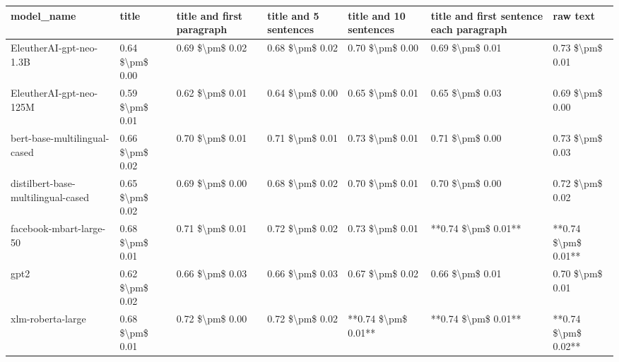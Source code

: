 \begin{tabular}{lllllll}
\toprule
                        model\_name &           title & title and first paragraph & title and 5 sentences & title and 10 sentences & title and first sentence each paragraph &            raw text \\
\midrule
           EleutherAI-gpt-neo-1.3B & 0.64 \$\textbackslash pm\$ 0.00 &           0.69 \$\textbackslash pm\$ 0.02 &       0.68 \$\textbackslash pm\$ 0.02 &        0.70 \$\textbackslash pm\$ 0.00 &                         0.69 \$\textbackslash pm\$ 0.01 &     0.73 \$\textbackslash pm\$ 0.01 \\
           EleutherAI-gpt-neo-125M & 0.59 \$\textbackslash pm\$ 0.01 &           0.62 \$\textbackslash pm\$ 0.01 &       0.64 \$\textbackslash pm\$ 0.00 &        0.65 \$\textbackslash pm\$ 0.01 &                         0.65 \$\textbackslash pm\$ 0.03 &     0.69 \$\textbackslash pm\$ 0.00 \\
      bert-base-multilingual-cased & 0.66 \$\textbackslash pm\$ 0.02 &           0.70 \$\textbackslash pm\$ 0.01 &       0.71 \$\textbackslash pm\$ 0.01 &        0.73 \$\textbackslash pm\$ 0.01 &                         0.71 \$\textbackslash pm\$ 0.00 &     0.73 \$\textbackslash pm\$ 0.03 \\
distilbert-base-multilingual-cased & 0.65 \$\textbackslash pm\$ 0.02 &           0.69 \$\textbackslash pm\$ 0.00 &       0.68 \$\textbackslash pm\$ 0.02 &        0.70 \$\textbackslash pm\$ 0.01 &                         0.70 \$\textbackslash pm\$ 0.00 &     0.72 \$\textbackslash pm\$ 0.02 \\
           facebook-mbart-large-50 & 0.68 \$\textbackslash pm\$ 0.01 &           0.71 \$\textbackslash pm\$ 0.01 &       0.72 \$\textbackslash pm\$ 0.02 &        0.73 \$\textbackslash pm\$ 0.01 &                     **0.74 \$\textbackslash pm\$ 0.01** & **0.74 \$\textbackslash pm\$ 0.01** \\
                              gpt2 & 0.62 \$\textbackslash pm\$ 0.02 &           0.66 \$\textbackslash pm\$ 0.03 &       0.66 \$\textbackslash pm\$ 0.03 &        0.67 \$\textbackslash pm\$ 0.02 &                         0.66 \$\textbackslash pm\$ 0.01 &     0.70 \$\textbackslash pm\$ 0.01 \\
                 xlm-roberta-large & 0.68 \$\textbackslash pm\$ 0.01 &           0.72 \$\textbackslash pm\$ 0.00 &       0.72 \$\textbackslash pm\$ 0.02 &    **0.74 \$\textbackslash pm\$ 0.01** &                     **0.74 \$\textbackslash pm\$ 0.01** & **0.74 \$\textbackslash pm\$ 0.02** \\
\bottomrule
\end{tabular}
